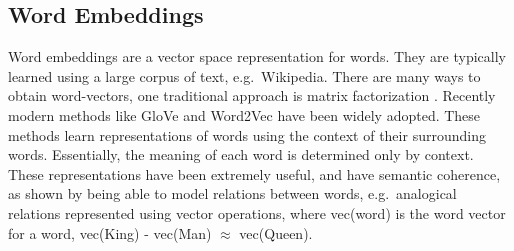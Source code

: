 







\subsection{Word Embeddings}\label{bg:WordVectors}


Word embeddings are a vector space representation for  words. They are typically learned using a large corpus of  text, e.g.\ Wikipedia.  There are many ways to obtain word-vectors, one traditional approach is  matrix factorization \cite{Evy2007}. Recently modern methods like GloVe \cite{Pennington2014} and Word2Vec \cite{Mikolov2013} have been widely adopted. These methods learn representations of  words using the context of their surrounding words.  Essentially, the meaning of each word is determined only by  context. These representations have been extremely useful, and have semantic coherence, as shown by  being able to model relations between words, e.g.\  analogical relations represented using  vector operations, where vec(word) is the word vector for a word,   vec(King) - vec(Man) $\approx$ vec(Queen).             

